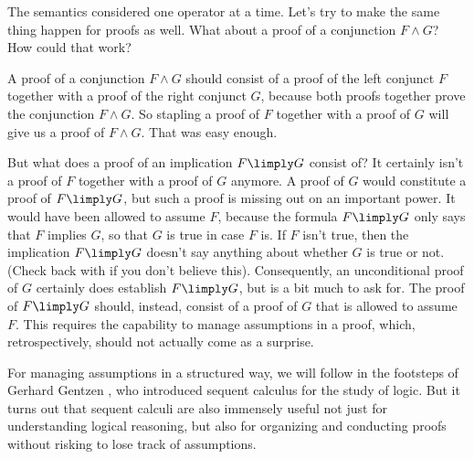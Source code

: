 \documentclass[11pt,twoside]{scrartcl}
\begin{document}
The semantics considered one operator at a time.
Let's try to make the same thing happen for proofs as well.
What about a proof of a conjunction \(F \land G\)?
How could that work?

A proof of a conjunction \(F \land G\) should consist of a proof of the left conjunct $F$ together with a proof of the right conjunct $G$, because both proofs together prove the conjunction \(F \land G\).
So stapling a proof of $F$ together with a proof of $G$ will give us a proof of \(F \land G\).
That was easy enough.

But what does a proof of an implication \(F \limply G\) consist of?
It certainly isn't a proof of $F$ together with a proof of $G$ anymore.
A proof of $G$ would constitute a proof of \(F \limply G\), but such a proof is missing out on an important power.
It would have been allowed to assume $F$, because the formula \(F \limply G\) only says that $F$ implies $G$, so that $G$ is true in case $F$ is.
If $F$ isn't true, then the implication \(F \limply G\) doesn't say anything about whether $G$ is true or not.
(Check back with  if you don't believe this).
Consequently, an unconditional proof of $G$ certainly does establish \(F \limply G\), but is a bit much to ask for.
The proof of \(F \limply G\) should, instead, consist of a proof of $G$ that is allowed to assume $F$.
This requires the capability to manage assumptions in a proof, which, retrospectively, should not actually come as a surprise.

For managing assumptions in a structured way, we will follow in the footsteps of Gerhard Gentzen \cite{Gentzen35I}, who introduced sequent calculus for the study of logic.
But it turns out that sequent calculi are also immensely useful not just for understanding logical reasoning, but also for organizing and conducting proofs without risking to lose track of assumptions.
\end{document}
